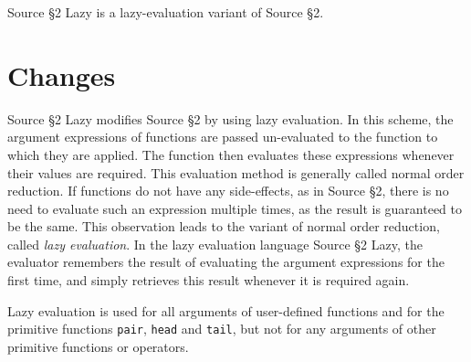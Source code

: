 





Source \S 2 Lazy is a lazy-evaluation variant of Source \S 2.

\section{Changes}

Source \S 2 Lazy modifies Source \S 2 by using
lazy evaluation. In
this scheme, the argument expressions of functions are passed un-evaluated
to the function to which they are applied. The function then evaluates
these expressions whenever their values are required. This evaluation
method is generally
called normal order reduction. If functions
do not have any side-effects, as in Source \S 2,
there is no need to evaluate such an expression
multiple times, as the result is guaranteed to be the same. This observation
leads to the variant of normal order reduction, called \emph{lazy evaluation}.
In the lazy evaluation language Source \S 2 Lazy,
the evaluator remembers the result of evaluating the
argument expressions for the first time, and simply retrieves this result
whenever it is required again.

Lazy evaluation is used for all arguments of user-defined functions and
for the primitive functions \lstinline{pair}, \lstinline{head} and
\lstinline{tail}, but
not for any arguments of other primitive functions or operators.

\newpage































\newpage



    
